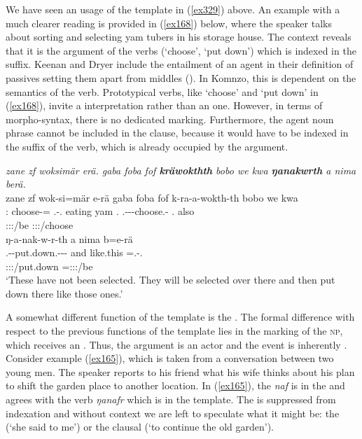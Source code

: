 We have seen an  usage of the  template in (\ref{ex329}) above. An example with a much clearer  reading is provided in (\ref{ex168}) below, where the speaker talks about sorting and selecting yam tubers in his storage house. The context reveals that it is the  argument of the verbs (`choose', `put down') which is indexed in the suffix. Keenan and Dryer include the entailment of an agent in their definition of passives setting them apart from middles (\citeyear[352]{Keenan:2007passives}). In Komnzo, this is dependent on the semantics of the verb. Prototypical  verbs, like `choose' and `put down' in (\ref{ex168}), invite a  interpretation rather than an  one. However, in terms of morpho-syntax, there is no dedicated  marking. Furthermore, the agent noun phrase cannot be included in the clause, because it would have to be indexed in the suffix of the verb, which is already occupied by the  argument.

\begin{exe}
	\ex \emph{zane zf woksimär erä. gaba foba fof \textbf{kräwokthth} bobo we kwa \textbf{ŋanakwrth} a nima berä.}\\
	\glll zane zf wok-si=mär e-rä gaba foba fof k-ra-a-wokth-th bobo we kwa\\
	\Dem:\Prox{} \Imm{} choose-\Nmlz=\Priv{} \Stnsg.\Alph-\Cop.\Ndu{} {eating yam} \Dist.\Abl{} \Emph{} \M.\Bet{}-\Irr-\Vc\textbar\Ndu-choose.\Rs-\Stnsg{} \Med.\All{} also \Fut{}\\
	{} {} {} \footnotesize{\Stpl:\Sbj:\Nonpast:\Ipfv/be} {} {} {} \footnotesize{\Stpl:\Sbj:\Irr:\Pfv/choose} {} {} {}\\
	\sn
	\glll ŋ-a-nak-w-r-th a nima b=e-rä\\
	\M.\Alph-\Vc-put.down.\Ext-\Ndu-\Lk-\Stnsg{} and like.this \Med=\Stnsg.\Alph-\Cop.\Ndu{}\\
	\footnotesize{\Stpl:\Sbj:\Nonpast:\Ipfv/put.down} {} {} \footnotesize{\Med=\Stpl:\Sbj:\Nonpast:\Ipfv/be}\\
	\trans `These have not been selected. They will be selected over there and then put down there like those ones.' 
	\label{ex168}
\end{exe}

A somewhat different function of the  template is the  . The formal difference with respect to the previous functions of the  template lies in the marking of the \textsc{np}, which receives an . Thus, the argument is an actor and the event is inherently . Consider example (\ref{ex165}), which is taken from a conversation between two young men. The speaker reports to his friend what his wife thinks about his plan to shift the garden place to another location. In (\ref{ex165}), the  \emph{naf} is in the   and agrees with the verb \emph{ŋanafr} which is in the  template. The  is suppressed from indexation and without context we are left to speculate what it might be: the  (`she said to me') or the clausal  (`to continue the old garden').

